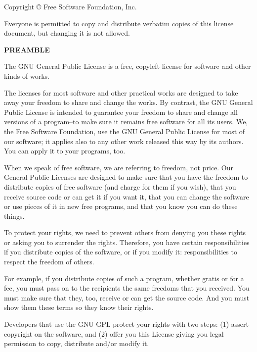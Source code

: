 

\blank
Copyright \copyright {} Free Software Foundation, Inc. 

Everyone is permitted to copy and distribute verbatim copies of this license document, but changing it is not allowed.

{\bf PREAMBLE}

The GNU General Public License is a free, copyleft license for software and other kinds of works.

The licenses for most software and other practical works are designed to take away your freedom to share and change the works.  By contrast, the GNU General Public License is intended to guarantee your freedom to share and change all versions of a program--to make sure it remains free software for all its users.  We, the Free Software Foundation, use the GNU General Public License for most of our software; it applies also to any other work released this way by its authors.  You can apply it to your programs, too.

When we speak of free software, we are referring to freedom, not price.  Our General Public Licenses are designed to make sure that you have the freedom to distribute copies of free software (and charge for them if you wish), that you receive source code or can get it if you want it, that you can change the software or use pieces of it in new free programs, and that you know you can do these things.

To protect your rights, we need to prevent others from denying you these rights or asking you to surrender the rights.  Therefore, you have certain responsibilities if you distribute copies of the software, or if you modify it: responsibilities to respect the freedom of others.

For example, if you distribute copies of such a program, whether gratis or for a fee, you must pass on to the recipients the same freedoms that you received.  You must make sure that they, too, receive or can get the source code.  And you must show them these terms so they know their rights.

Developers that use the GNU GPL protect your rights with two steps: (1) assert copyright on the software, and (2) offer you this License giving you legal permission to copy, distribute and/or modify it.

